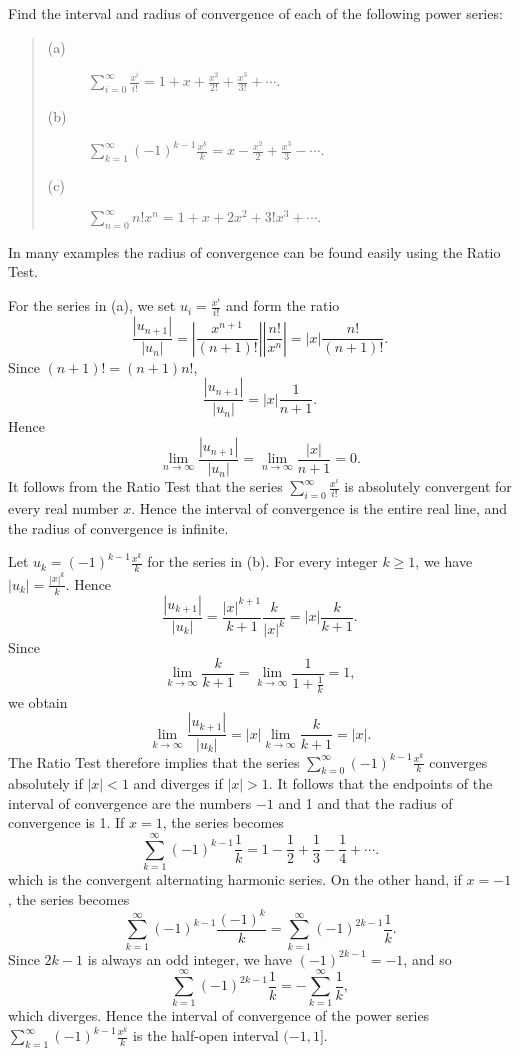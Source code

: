 \begin{example}

Find the interval and radius of convergence of each of the following power series:
 
\begin{quote}
\begin{description}
\item[(a)] $\sum_{i=0}^\infty \frac{x^i}{i!} = 1 + x + \frac{x^2}{2!} + \frac{x^3}{3!} + \cdots.$
\item[(b)] $\sum_{k=1}^\infty(-1)^{k-1} \frac{x^k}{k} = x - \frac{x^2}{2} + \frac{x^3}{3} - \cdots.$
\item[(c)] $\sum_{n=0}^\infty n!x^n = 1 + x + 2x^2 + 3!x^3 + \cdots.$
\end{description}
\end{quote}
 
\noindent In many examples the radius of convergence can be found easily using the Ratio Test.

For the series in (a), we set $u_i = \frac{x^i}{i!}$ and form the ratio
$$
\frac{|u_{n+1}|}{|u_n|} = | \frac{x^{n+1}}{(n + 1)!} | | \frac{n!}{x^n} | = |x| \frac{n!}{(n + 1)!}.
$$
\noindent Since $(n+ 1)! = (n + 1)n!$,
$$
\frac{|u_{n+1}|}{|u_n|}  = |x| \frac{1}{n + 1}.
$$
\noindent Hence
$$
\lim_{n \rightarrow \infty} \frac{|u_{n+1}|}{|u_n|} = \lim_{n \rightarrow \infty} \frac{|x|}{n + 1} = 0. 
$$
\noindent It follows from the Ratio Test that the series $\sum_{i=0}^\infty \frac{x^i}{i!}$ is absolutely convergent for every real number $x$. Hence the interval of convergence is the entire real line, and the radius of convergence is infinite.

Let $u_k = (-1)^{k-1} \frac{x^k}{k}$ for the series in (b). For every integer $k \geq 1$, we have $|u_k| = \frac{|x|^k}{k}$. Hence
$$
\frac{|u_{k+1}|}{|u_k|} = \frac{|x|^{k+1}}{k+1} \frac{k}{|x|^k} = |x| \frac{k}{k+1} . 
$$
\noindent Since 
$$
\lim_{k \rightarrow \infty} \frac{k}{k+1} = \lim_{k \rightarrow \infty} \frac{1}{1 + \frac{1}{k} } = 1,
$$
\noindent we obtain
$$
\lim_{k \rightarrow \infty} \frac{|u_{k+1}|}{|u_k|} = |x| \lim_{k \rightarrow \infty} \frac{k}{k + 1} = |x| .
$$
\noindent The Ratio Test therefore implies that the series $\sum_{k=0}^\infty (-1)^{k-1} \frac{x^k}{k}$ converges absolutely if $|x| < 1$ and diverges if $|x| > 1$. It follows that the endpoints of the interval of convergence are the numbers $-1$ and 1 and that the radius of convergence is 1. If $x = 1$, the series becomes
$$
\sum_{k=1}^\infty (-1)^{k-1} \frac{1}{k} = 1- \frac{1}{2} + \frac{1}{3} - \frac{1}{4} + \cdots .
$$
\noindent which is the convergent alternating harmonic series. On the other hand, if $x = -1$, the series becomes
$$
\sum_{k=1}^\infty (-1)^{k-1} \frac{(-1)^k}{k} = \sum_{k=1}^\infty (-1)^{2k-1} \frac{1}{k} . 
$$
\noindent Since $2k - 1$ is always an odd integer, we have $(-1)^{2k-1} = -1$, and so  
$$
\sum_{k=1}^\infty (-1)^{2k-1} \frac{1}{k} = -\sum_{k=1}^\infty \frac{1}{k},
$$
\noindent which diverges. Hence the interval of convergence of the power series $\sum_{k=1}^\infty (-1)^{k-1} \frac{x^k}{k}$ is the half-open interval $(-1, 1]$.


\end{example}
